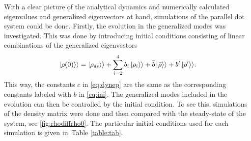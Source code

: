 \documentclass[../main.tex]{subfiles}
\begin{document}
With a clear picture of the analytical dynamics and numerically calculated eigenvalues and generalized eigenvectors at hand, simulations of the parallel dot system could be done. Firstly, the evolution in the generalized modes was investigated. This was done by introducing initial conditions consisting of linear combinations of the generalized eigenvectors
\begin{equation}\label{eq:ini}
    \ket{\rho(0)}\rangle = \ket{\rho_{ss}}\rangle + \sum_{i=2}^4 b_i\ket{\rho_i}\rangle + \bar b \ket{\bar\rho}\rangle + b'\ket{\rho'}\rangle.
\end{equation}
This way, the constants $c$ in \cref{eq:dynep} are the same as the corresponding constants labeled with $b$ in \cref{eq:ini}. The generalized modes included in the evolution can then be controlled by the initial condition. To see this, simulations of the density matrix were done and then compared with the steady-state of the system, see \cref{fig:rhodiffrho0}. The particular initial conditions used for each simulation is given in~Table \ref{table:tab}.
\end{document}
